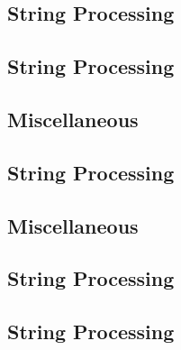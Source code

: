 \vspace{0.1\baselineskip}\subsection{String Processing}
\raggedbottom
\vspace{-.7\baselineskip}\hrulefill
\vspace{0.1\baselineskip}\subsection{String Processing}
\raggedbottom
\vspace{-.7\baselineskip}\hrulefill
\vspace{0.1\baselineskip}\subsection{Miscellaneous}
\raggedbottom
\vspace{-.7\baselineskip}\hrulefill
\vspace{0.1\baselineskip}\subsection{String Processing}
\raggedbottom
\vspace{-.7\baselineskip}\hrulefill
\vspace{0.1\baselineskip}\subsection{Miscellaneous}
\raggedbottom
\vspace{-.7\baselineskip}\hrulefill
\vspace{0.1\baselineskip}\subsection{String Processing}
\raggedbottom
\vspace{-.7\baselineskip}\hrulefill
\vspace{0.1\baselineskip}\subsection{String Processing}
